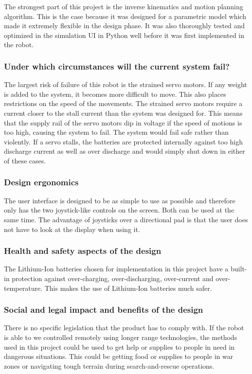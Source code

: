 The strongest part of this project is the inverse kinematics and motion planning algorithm. This is the case because it was designed for a parametric model which made it extremely flexible in the design phase. It was also thoroughly tested and optimized in the simulation UI in Python well before it was first implemented in the robot.

\subsubsection{Under which circumstances will the current system fail?}
The largest risk of failure of this robot is the strained servo motors. If any weight is added to the system, it becomes more difficult to move. This also places restrictions on the speed of the movements. The strained servo motors require a current closer to the stall current than the system was designed for. This means that the supply rail of the servo motors dip in voltage if the speed of motions is too high, causing the system to fail. The system would fail safe rather than violently. If a servo stalls, the batteries are protected internally against too high discharge current as well as over discharge and would simply shut down in either of these cases.

\subsubsection{Design ergonomics}
The user interface is designed to be as simple to use as possible and therefore only has the two joystick-like controls on the screen. Both can be used at the same time. The advantage of joysticks over a directional pad is that the user does not have to look at the display when using it.
 
\subsubsection{Health and safety aspects of the design}
The Lithium-Ion batteries chosen for implementation in this project have a built-in protection against over-charging, over-discharging, over-current and over-temperature. This makes the use of Lithium-Ion batteries much safer.
\subsubsection{Social and legal impact and benefits of the design}
There is no specific legislation that the product has to comply with. If the robot is able to we controlled remotely using longer range technologies, the methods used in this project could be used to get help or supplies to people in need in dangerous situations. This could be getting food or supplies to people in war zones or navigating tough terrain during search-and-rescue operations.

